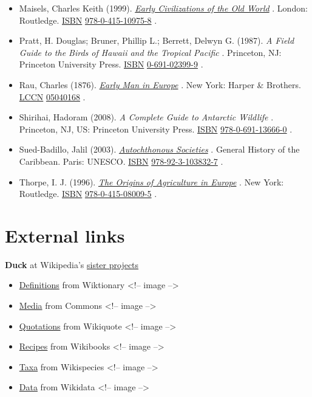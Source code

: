 \documentclass[11pt,a4paper]{article}
\begin{document}
\begin{itemize}
\item Maisels, Charles Keith (1999). \href{https://books.google.com/books?id=I2dgI2ijww8C\&pg=PA42}{\textit{Early Civilizations of the Old World}} . London: Routledge. \href{/wiki/ISBN\_(identifier)}{ISBN} \href{/wiki/Special:BookSources/978-0-415-10975-8}{978-0-415-10975-8} .
\item Pratt, H. Douglas; Bruner, Phillip L.; Berrett, Delwyn G. (1987). \textit{A Field Guide to the Birds of Hawaii and the Tropical Pacific} . Princeton, NJ: Princeton University Press. \href{/wiki/ISBN\_(identifier)}{ISBN} \href{/wiki/Special:BookSources/0-691-02399-9}{0-691-02399-9} .
\item Rau, Charles (1876). \href{https://books.google.com/books?id=9XBgAAAAIAAJ\&pg=133}{\textit{Early Man in Europe}} . New York: Harper \& Brothers. \href{/wiki/LCCN\_(identifier)}{LCCN} \href{https://lccn.loc.gov/05040168}{05040168} .
\item Shirihai, Hadoram (2008). \textit{A Complete Guide to Antarctic Wildlife} . Princeton, NJ, US: Princeton University Press. \href{/wiki/ISBN\_(identifier)}{ISBN} \href{/wiki/Special:BookSources/978-0-691-13666-0}{978-0-691-13666-0} .
\item Sued-Badillo, Jalil (2003). \href{https://books.google.com/books?id=zexcW7q-4LgC\&pg=PA65}{\textit{Autochthonous Societies}} . General History of the Caribbean. Paris: UNESCO. \href{/wiki/ISBN\_(identifier)}{ISBN} \href{/wiki/Special:BookSources/978-92-3-103832-7}{978-92-3-103832-7} .
\item Thorpe, I. J. (1996). \href{https://books.google.com/books?id=YA-EAgAAQBAJ\&pg=PA68}{\textit{The Origins of Agriculture in Europe}} . New York: Routledge. \href{/wiki/ISBN\_(identifier)}{ISBN} \href{/wiki/Special:BookSources/978-0-415-08009-5}{978-0-415-08009-5} .
\end{itemize}

\section{External links}

\textbf{Duck} at Wikipedia's \href{/wiki/Wikipedia:Wikimedia\_sister\_projects}{sister projects}

\begin{itemize}
\item \href{https://en.wiktionary.org/wiki/duck}{Definitions} from Wiktionary
<!-- image -->
\item \href{https://commons.wikimedia.org/wiki/Anatidae}{Media} from Commons
<!-- image -->
\item \href{https://en.wikiquote.org/wiki/Birds}{Quotations} from Wikiquote
<!-- image -->
\item \href{https://en.wikibooks.org/wiki/Cookbook:Duck}{Recipes} from Wikibooks
<!-- image -->
\item \href{https://species.wikimedia.org/wiki/Anatidae}{Taxa} from Wikispecies
<!-- image -->
\item \href{https://www.wikidata.org/wiki/Q3736439}{Data} from Wikidata
<!-- image -->
\end{itemize}
\end{document}
